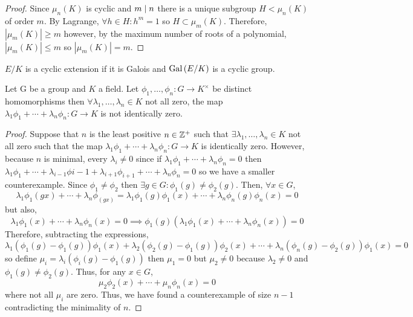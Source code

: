 \documentclass[12pt]{extarticle}
\begin{document}
\begin{proof}
Since $\mu_n(K)$ is cyclic and $m \mid n$ there is a unique subgroup $H < \mu_n(K)$ of order $m$. By Lagrange, $\forall h \in H : h^m = 1$ so $H \subset \mu_m(K)$. Therefore, $|\mu_m(K)| \ge m$ however, by the maximum number of roots of a polynomial, $|\mu_m(K)| \le m$ so $|\mu_m(K)| = m$.  
\end{proof}

\begin{definition}
$E/K$ is a cyclic extension if it is Galois and $\mathrm{Gal}\left( E/K \right)$ is a cyclic group.
\end{definition}

\begin{lemma}
Let G be a group and $K$ a field. Let $\phi_1, \dots, \phi_n : G \to K^\times$ be distinct homomorphisms then $\forall \lambda_1, \dots, \lambda_n \in K$ not all zero, the map $\lambda_1 \phi_1 + \cdots + \lambda_n \phi_n : G \to K$ is not identically zero. 
\end{lemma}

\begin{proof}
Suppose that $n$ is the least positive $n \in \mathbb{Z}^{+}$ such that $\exists \lambda_1, \dots, \lambda_n \in K$ not all zero such that the map $\lambda_1 \phi_1 + \cdots + \lambda_n \phi_n : G \to K$ is identically zero. However, because $n$ is minimal, every $\lambda_i \neq 0$ since if $\lambda_1 \phi_1 + \cdots + \lambda_n \phi_n = 0$ then $\lambda_1 \phi_1 + \cdots  + \lambda_{i-1} \phi{i -1} + \lambda_{i+1} \phi_{i+1} + \cdots + \lambda_n \phi_n = 0$ so we have a smaller counterexample. Since $\phi_1 \neq \phi_2$ then $\exists g \in G : \phi_1(g) \neq \phi_2(g)$. Then, $\forall x \in G$, 
\[\lambda_1 \phi_1(gx) + \cdots + \lambda_n \phi_(gx) = \lambda_1 \phi_1(g) \phi_1(x) + \cdots + \lambda_n \phi_n(g) \phi_n(x) = 0\]   
but also,
\[\lambda_1 \phi_1(x) + \cdots + \lambda_n \phi_n(x) = 0 \implies \phi_1(g) (\lambda_1 \phi_1(x) + \cdots + \lambda_n \phi_n(x)) = 0\]   
Therefore, subtracting the expressions,
$\lambda_1 ( \phi_1(g) - \phi_1(g)) \phi_1(x) + \lambda_2 ( \phi_2(g) - \phi_1(g)) \phi_2(x) + \cdots + \lambda_n ( \phi_n(g) - \phi_2(g)) \phi_1(x) = 0$ 
so define $\mu_i = \lambda_i (\phi_i(g) - \phi_1(g))$ then $\mu_1 = 0$ but $\mu_2 \neq 0$ because $\lambda_2 \neq 0$ and $\phi_1(g) \neq \phi_2(g)$. Thus, for any $x \in G$,
\[ \mu_2 \phi_2(x) + \cdots + \mu_n \phi_n(x) = 0\]
where not all $\mu_i$ are zero. Thus, we have found a counterexample of size $n - 1$ contradicting the minimality of $n$. 
\end{proof}
\end{document}
